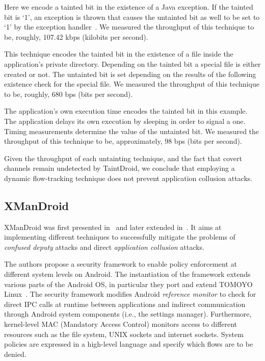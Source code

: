  Here we encode a tainted
bit in the existence of a Java exception. If the tainted bit is `1',
an exception is thrown that causes the untainted bit as well to be set
to `1' by the exception handler~\cite{vmifc}. We measured the
throughput of this technique to be, roughly, 107.42 kbps (kilobits per
second).

 This technique encodes the tainted bit
in the existence of a file inside the application's private directory.
Depending on the tainted bit a special file is either created or not.
The untainted bit is set depending on the results of the following
existence check for the special file. We measured the throughput of
this technique to be, roughly, 680 bps (bits per second).

 The application's own execution time
encodes the tainted bit in this example. The application delays its
own execution by sleeping in order to signal a one. Timing
measurements determine the value of the untainted bit. We measured the
throughput of this technique to be, approximately, 98 bps (bits per
second).

Given the throughput of each untainting technique, and the fact that
covert channels remain undetected by TaintDroid, we conclude that
employing a dynamic flow-tracking technique does not prevent
application collusion attacks.

\subsection{XManDroid}

XManDroid was first presented in~\cite{TUD-CS-2011-0127} and later
extended in~\cite{newxmandroid}. It aims at implementing different
techniques to successfully mitigate the problems of \emph{confused
  deputy} attacks and direct \emph{application collusion} attacks.

The authors propose a security framework to enable policy enforcement
at different system levels on Android. The instantiation of the
framework extends various parts of the Android OS, in particular they
port and extend TOMOYO Linux~\cite{tomoyo}. The security framework
modifies Android \emph{reference monitor} to check for direct IPC
calls at runtime between applications and indirect communication
through Android system components (i.e., the settings
manager). Furthermore, kernel-level MAC (Mandatory Access Control)
monitors access to different resources such as the file system, UNIX
sockets and internet sockets. System policies are expressed in a
high-level language and specify which flows are to be denied.

